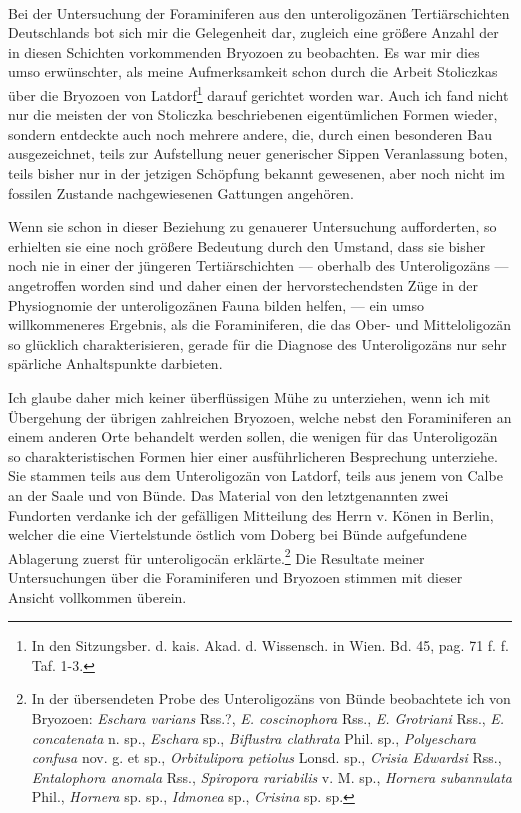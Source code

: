 \documentclass[a4paper, 11pt, oneside, german]{article}
\begin{document}
\paragraph{}
Bei der Untersuchung der Foraminiferen aus den unteroligozänen Tertiärschichten Deutschlands bot sich mir die Gelegenheit dar, zugleich eine größere Anzahl der in diesen Schichten vorkommenden Bryozoen zu beobachten. Es war mir dies umso erwünschter, als meine Aufmerksamkeit schon durch die Arbeit Stoliczkas über die Bryozoen von Latdorf\footnote{In den Sitzungsber. d. kais. Akad. d. Wissensch. in Wien. Bd. 45, pag. 71 f. f. Taf. 1-3.} darauf gerichtet worden war. Auch ich fand nicht nur die meisten der von Stoliczka beschriebenen eigentümlichen Formen wieder, sondern entdeckte auch noch mehrere andere, die, durch einen besonderen Bau ausgezeichnet, teils zur Aufstellung neuer generischer Sippen Veranlassung boten, teils bisher nur in der jetzigen Schöpfung bekannt gewesenen, aber noch nicht im fossilen Zustande nachgewiesenen Gattungen angehören.

Wenn sie schon in dieser Beziehung zu genauerer Untersuchung aufforderten, so erhielten sie eine noch größere Bedeutung durch den Umstand, dass sie bisher noch nie in einer der jüngeren Tertiärschichten --- oberhalb des Unteroligozäns --- angetroffen worden sind und daher einen der hervorstechendsten Züge in der Physiognomie der unteroligozänen Fauna bilden helfen, --- ein umso willkommeneres Ergebnis, als die Foraminiferen, die das Ober- und Mitteloligozän so glücklich charakterisieren, gerade für die Diagnose des Unteroligozäns nur sehr spärliche Anhaltspunkte darbieten.

Ich glaube daher mich keiner überflüssigen Mühe zu unterziehen, wenn ich mit Übergehung der übrigen zahlreichen Bryozoen, welche nebst den Foraminiferen an einem anderen Orte behandelt werden sollen, die wenigen für das Unteroligozän so charakteristischen Formen hier einer ausführlicheren Besprechung unterziehe. Sie stammen teils aus dem Unteroligozän von Latdorf, teils aus jenem von Calbe an der Saale und von Bünde. Das Material von den letztgenannten zwei Fundorten verdanke ich der gefälligen Mitteilung des Herrn v. Könen in Berlin, welcher die eine Viertelstunde östlich vom Doberg bei Bünde aufgefundene Ablagerung zuerst für unteroligocän erklärte.\footnote{In der übersendeten Probe des Unteroligozäns von Bünde beobachtete ich von Bryozoen: \emph{Eschara varians} Rss.?, \emph{E. coscinophora} Rss., \emph{E. Grotriani} Rss., \emph{E. concatenata} n. sp., \emph{Eschara} sp., \emph{Biflustra clathrata} Phil. sp., \emph{Polyeschara confusa} nov. g. et sp., \emph{Orbitulipora petiolus} Lonsd. sp., \emph{Crisia Edwardsi} Rss., \emph{Entalophora anomala} Rss., \emph{Spiropora rariabilis} v. M. sp., \emph{Hornera subannulata} Phil., \emph{Hornera} sp. sp., \emph{Idmonea} sp., \emph{Crisina} sp. sp.} Die Resultate meiner Untersuchungen über die Foraminiferen und Bryozoen stimmen mit dieser Ansicht vollkommen überein.
\end{document}
